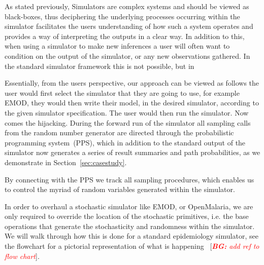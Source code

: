 \documentclass{article}
\newcommand{\bg}[1]{~{{[{\it \textcolor{red}{{\bf BG:} #1}}]}}}
\begin{document}
As stated previously, Simulators are complex systems and should be viewed as black-boxes, thus deciphering the underlying processes occurring within the simulator facilitates the users understanding of how such a system operates and provides a way of interpreting the outputs in a clear way. In addition to this, when using a simulator to make new inferences a user will often want to condition on the output of the simulator, or any new observations gathered. In the standard simulator framework this is not possible, but in 

Essentially, from the users perspective, our approach can be viewed as follows the user would first select the simulator that they are going to use, for example EMOD, they would then write their model, in the desired simulator, according to the given simulator specification. The user would then run the simulator. Now comes the hijacking. During the forward run of the simulator all sampling calls from the random number generator are directed through the probabilistic programming system~(PPS), which in addition to the standard output of the simulator now generates a series of result summaries and path probabilities, as we demonstrate in Section~\ref{sec:casestudy}.

By connecting with the PPS we track all sampling procedures, which enables us to control the myriad of random variables generated within the simulator. 

In order to overhaul a stochastic simulator like EMOD, or OpenMalaria, we are only required to override the location of the stochastic primitives, i.e. the base operations that generate the stochasticity and randomness within the simulator. 
We will walk through how this is done for a standard epidemiology simulator, see the flowchart for a pictorial representation of what is happening \bg{add ref to flow chart}.
\end{document}
